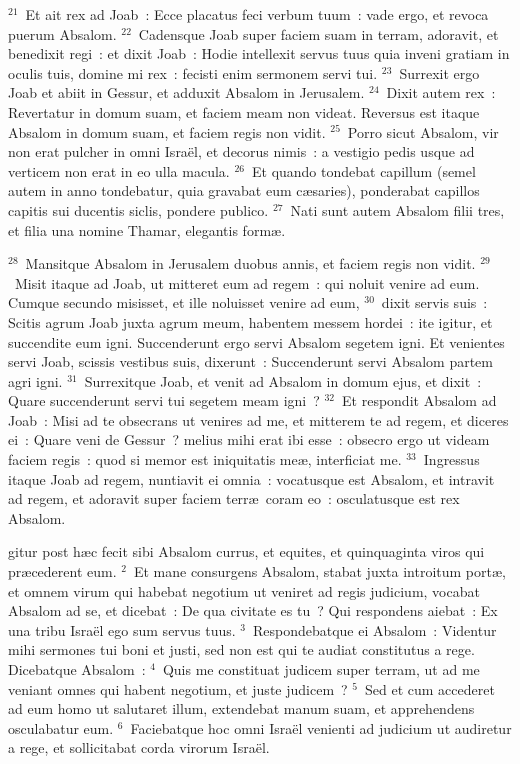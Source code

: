 ${}^{21}$~Et ait rex ad Joab~: Ecce placatus feci verbum tuum~: vade ergo, et revoca puerum Absalom.
${}^{22}$~Cadensque Joab super faciem suam in terram, adoravit, et benedixit regi~: et dixit Joab~: Hodie intellexit servus tuus quia inveni gratiam in oculis tuis, domine mi rex~: fecisti enim sermonem servi tui.
${}^{23}$~Surrexit ergo Joab et abiit in Gessur, et adduxit Absalom in Jerusalem.
${}^{24}$~Dixit autem rex~: Revertatur in domum suam, et faciem meam non videat. Reversus est itaque Absalom in domum suam, et faciem regis non vidit.
${}^{25}$~Porro sicut Absalom, vir non erat pulcher in omni Isra\"el, et decorus nimis~: a vestigio pedis usque ad verticem non erat in eo ulla macula.
${}^{26}$~Et quando tondebat capillum (semel autem in anno tondebatur, quia gravabat eum c\ae saries), ponderabat capillos capitis sui ducentis siclis, pondere publico.
${}^{27}$~Nati sunt autem Absalom filii tres, et filia una nomine Thamar, elegantis form\ae .


${}^{28}$~Mansitque Absalom in Jerusalem duobus annis, et faciem regis non vidit.
${}^{29}$~Misit itaque ad Joab, ut mitteret eum ad regem~: qui noluit venire ad eum. Cumque secundo misisset, et ille noluisset venire ad eum,
${}^{30}$~dixit servis suis~: Scitis agrum Joab juxta agrum meum, habentem messem hordei~: ite igitur, et succendite eum igni. Succenderunt ergo servi Absalom segetem igni. Et venientes servi Joab, scissis vestibus suis, dixerunt~: Succenderunt servi Absalom partem agri igni.
${}^{31}$~Surrexitque Joab, et venit ad Absalom in domum ejus, et dixit~: Quare succenderunt servi tui segetem meam igni~?
${}^{32}$~Et respondit Absalom ad Joab~: Misi ad te obsecrans ut venires ad me, et mitterem te ad regem, et diceres ei~: Quare veni de Gessur~? melius mihi erat ibi esse~: obsecro ergo ut videam faciem regis~: quod si memor est iniquitatis me\ae , interficiat me.
${}^{33}$~Ingressus itaque Joab ad regem, nuntiavit ei omnia~: vocatusque est Absalom, et intravit ad regem, et adoravit super faciem terr\ae\ coram eo~: osculatusque est rex Absalom.

\bchapter
{}gitur post h\ae c fecit sibi Absalom currus, et equites, et quinquaginta viros qui pr\ae cederent eum.
${}^{2}$~Et mane consurgens Absalom, stabat juxta introitum port\ae , et omnem virum qui habebat negotium ut veniret ad regis judicium, vocabat Absalom ad se, et dicebat~: De qua civitate es tu~? Qui respondens aiebat~: Ex una tribu Isra\"el ego sum servus tuus.
${}^{3}$~Respondebatque ei Absalom~: Videntur mihi sermones tui boni et justi, sed non est qui te audiat constitutus a rege. Dicebatque Absalom~:
${}^{4}$~Quis me constituat judicem super terram, ut ad me veniant omnes qui habent negotium, et juste judicem~?
${}^{5}$~Sed et cum accederet ad eum homo ut salutaret illum, extendebat manum suam, et apprehendens osculabatur eum.
${}^{6}$~Faciebatque hoc omni Isra\"el venienti ad judicium ut audiretur a rege, et sollicitabat corda virorum Isra\"el.



